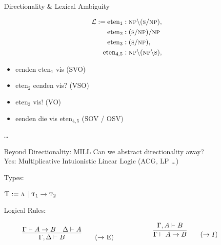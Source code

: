 \documentclass{beamer}
\newlength{\arrow}
\begin{document}
\begin{frame}{Directionality \& Lexical Ambiguity}
	\begin{minipage}{0.45\textwidth}
	\begin{align*}
	\mathcal{L} := \text{eten}_1 &: \textsc{np}\backslash (\textsc{s}/\textsc{np}), \\
					\text{eten}_2 &: (\textsc{s}/\textsc{np})/\textsc{np} \\
					\text{eten}_3 &: (\textsc{s}/\textsc{np}), \\
					\text{eten}_{4,5} &: \textsc{np}\backslash (\textsc{np}\backslash \textsc{s}), \\
	\end{align*}
	\end{minipage}\begin{minipage}{0.6\textwidth}
	\small
	\begin{itemize}
		\item[] eenden eten$_1$ vis (SVO)
		\item[] eten$_2$ eenden vis? (VSO)
		\item[] eten$_3$ vis! (VO)
		\item[] eenden die vis eten$_{4,5}$ (SOV / OSV)
	\end{itemize}
	\end{minipage}	
	\centering
		\dots \\
		\vfill
	\pause
		\large
		\frownie
\end{frame}

\begin{frame}{Beyond Directionality: MILL}
	Can we abstract directionality away?\\
	\pause
	Yes: \alert{Multiplicative Intuionistic Linear Logic} (ACG, LP \dots)
	
	\pause
	
	Types:
		\begin{center}{
		$\textsc{T} := \textsc{a} \ | \ \textsc{t}_1 \to \textsc{t}_2 $}
		\end{center}
	
	\pause	
	
	Logical Rules:
	\begin{align*}
    \begin{minipage}{0.5\textwidth}
	\[
        \infer{\Gamma, \Delta \vdash B}{
            \Gamma \vdash A \rightarrow B
            &
            \Delta \vdash A
        }\tag{$\rightarrow$ E}
    \]
    \end{minipage}    \begin{minipage}{0.5\textwidth}
    \[
        \infer{\Gamma \vdash A \rightarrow B}{
            \Gamma, A \vdash B
        }\tag{$\rightarrow I$}\\
    \]
    \end{minipage}
	\end{align*}
\end{frame}
\end{document}
